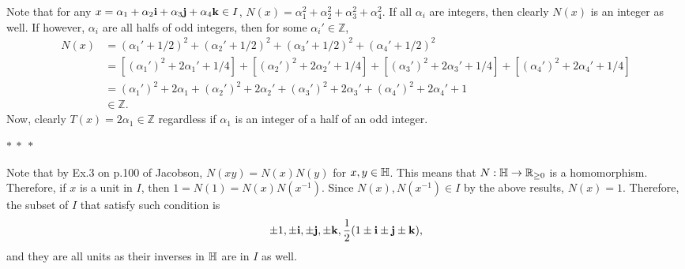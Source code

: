 \documentclass[12pt]{article}
\begin{document}
\begin{fproof}[Jacobson 2.4.5]
    Note that for any \(x = \alpha_1 + \alpha_2\mathbf{i} + \alpha_3 \mathbf{j} + \alpha_4\mathbf{k} \in I\),
    \(N(x) = \alpha_1^2 + \alpha_2^2 + \alpha_3^2 + \alpha_4^2\).
    If all \(\alpha_i\) are integers, then clearly \(N(x)\) is an integer as well.
    If however, \(\alpha_i\) are all halfs of odd integers, then for some \(\alpha_i' \in \mathbb{Z}\),
    \begin{align*}
        N(x) &= (\alpha_1' + 1/2)^2 + (\alpha_2' + 1/2)^2 + (\alpha_3' + 1/2)^2 + (\alpha_4' + 1/2)^2\\
        &= [(\alpha_1')^2 + 2 \alpha_1' + 1/4] + [(\alpha_2')^2 + 2 \alpha_2' + 1/4] + [(\alpha_3')^2 + 2 \alpha_3' + 1/4] + [(\alpha_4')^2 + 2 \alpha_4' + 1/4]\\
        &= (\alpha_1')^2 + 2 \alpha_1 + (\alpha_2')^2 + 2 \alpha_2' + (\alpha_3')^2 + 2 \alpha_3' + (\alpha_4')^2 + 2 \alpha_4' + 1\\
        & \in \mathbb{Z}.
    \end{align*}
    Now, clearly \(T(x) = 2 \alpha_1 \in \mathbb{Z}\) regardless if \(\alpha_1\) is an integer of a half of an odd integer.

    \begin{center}
        \(\ast~\ast~\ast\)
    \end{center}

    Note that by Ex.3 on p.100 of Jacobson, \(N(xy) = N(x)N(y)\) for \(x,y \in \mathbb {H}\).
    This means that \(N: \mathbb {H} \to \mathbb {R}_{\geq 0}\) is a homomorphism.
    Therefore, if \(x\) is a unit in \(I\), then \(1 = N(1) = N(x)N(x^{-1})\).
    Since \(N(x), N(x^{-1}) \in I\) by the above results, \(N(x) = 1\).
    Therefore, the subset of \(I\) that satisfy such condition is
    \begin{align*}
        \pm 1, \pm \mathbf{i}, \pm \mathbf{j}, \pm \mathbf{k}, \frac{1}{2}(1 \pm \mathbf{i} \pm \mathbf{j} \pm \mathbf{k}),
    \end{align*}
    and they are all units as their inverses in \(\mathbb {H}\) are in \(I\) as well.
    

\end{fproof}
\newpage
\end{document}
